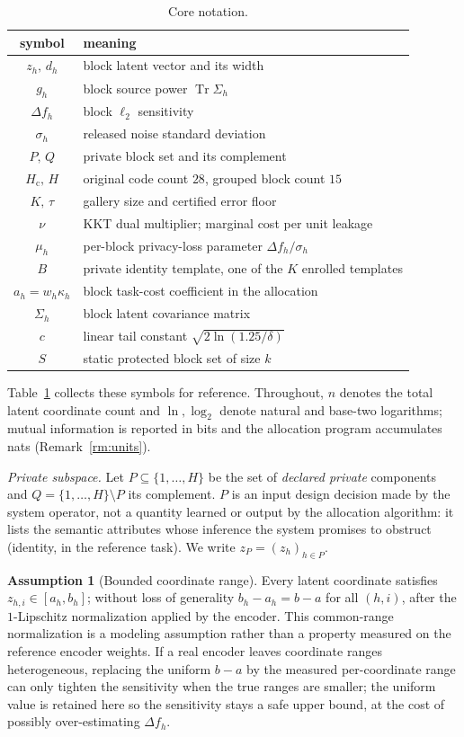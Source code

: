 \documentclass[10pt,twocolumn,letterpaper]{article}
\theoremstyle{plain}
\theoremstyle{definition}
\newtheorem{assumption}{Assumption}
\begin{document}
\begin{table}[h]
\centering\footnotesize
\setlength{\tabcolsep}{4pt}
\caption{Core notation.}
\label{tab:notation}
\begin{tabular}{cp{4.4cm}}
\toprule
symbol & meaning \\
\midrule
$z_h,\,d_h$ & block latent vector and its width \\
$g_h$ & block source power $\operatorname{Tr}\Sigma_h$ \\
$\Delta f_h$ & block $\ell_2$ sensitivity \\
$\sigma_h$ & released noise standard deviation \\
$P,\,Q$ & private block set and its complement \\
$H_{\mathrm c},\,H$ & original code count $28$, grouped block count $15$ \\
$K,\,\tau$ & gallery size and certified error floor \\
$\nu$ & KKT dual multiplier; marginal cost per unit leakage \\
$\mu_h$ & per-block privacy-loss parameter $\Delta f_h/\sigma_h$ \\
$B$ & private identity template, one of the $K$ enrolled templates \\
$a_h=w_h\kappa_h$ & block task-cost coefficient in the allocation \\
$\Sigma_h$ & block latent covariance matrix \\
$c$ & linear tail constant $\sqrt{2\ln(1.25/\delta)}$ \\
$S$ & static protected block set of size $k$ \\
\bottomrule
\end{tabular}
\end{table}
Table~\ref{tab:notation} collects these symbols for reference. Throughout,
$n$ denotes the total latent coordinate count and $\ln,\log_2$ denote natural
and base-two logarithms; mutual information is reported in bits and the
allocation program accumulates nats (Remark~\ref{rm:units}).

\emph{Private subspace.} Let $P\subseteq\{1,\dots,H\}$ be the set of
\emph{declared private} components and $Q=\{1,\dots,H\}\setminus P$ its
complement. $P$ is an input design decision made by the system operator, not a
quantity learned or output by the allocation algorithm: it lists the semantic
attributes whose inference the system promises to obstruct (identity, in the
reference task). We write $z_P=(z_h)_{h\in P}$.

\begin{assumption}[Bounded coordinate range]
\label{as:range}
Every latent coordinate satisfies $z_{h,i}\in[a_h,b_h]$; without loss of
generality $b_h-a_h=b-a$ for all $(h,i)$, after the $1$-Lipschitz
normalization applied by the encoder. This common-range normalization is a
modeling assumption rather than a property measured on the reference encoder
weights. If a real encoder leaves coordinate ranges heterogeneous, replacing
the uniform $b-a$ by the measured per-coordinate range can only tighten the
sensitivity when the true ranges are smaller; the uniform value is retained
here so the sensitivity stays a safe upper bound, at the cost of possibly
over-estimating $\Delta f_h$.
\end{assumption}
\end{document}
